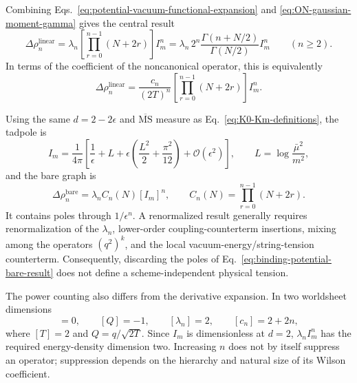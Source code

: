 Combining Eqs.~\eqref{eq:potential-vacuum-functional-expansion} and
\eqref{eq:ON-gaussian-moment-gamma} gives the central result
\begin{equation}
  \boxed{
  \Delta\rho_n^{\mathrm{linear}}
  =\lambda_n\left[\prod_{r=0}^{n-1}(N+2r)\right]I_m^n
  =\lambda_n\,2^n\frac{\Gamma(n+N/2)}{\Gamma(N/2)}I_m^n
  }
  \qquad(n\geq2).
  \label{eq:binding-potential-central-result}
\end{equation}
In terms of the coefficient of the noncanonical operator, this is equivalently
\begin{equation}
  \Delta\rho_n^{\mathrm{linear}}
  =\frac{c_n}{(2T)^n}
   \left[\prod_{r=0}^{n-1}(N+2r)\right]I_m^n.
  \label{eq:binding-potential-noncanonical-result}
\end{equation}

Using the same $d=2-2\epsilon$ and $\overline{\mathrm{MS}}$ measure as
Eq.~\eqref{eq:K0-Km-definitions}, the tadpole is
\begin{equation}
  I_m=\frac{1}{4\pi}
  \left[\frac{1}{\epsilon}+L
  +\epsilon\left(\frac{L^2}{2}+\frac{\pi^2}{12}\right)
  +\mathcal O(\epsilon^2)\right],
  \qquad L=\log\frac{\bar\mu^2}{m^2},
\end{equation}
and the bare graph is
\begin{equation}
  \Delta\rho_n^{\mathrm{bare}}
  =\lambda_n C_n(N)[I_m]^n,
  \qquad C_n(N)=\prod_{r=0}^{n-1}(N+2r).
  \label{eq:binding-potential-bare-result}
\end{equation}
It contains poles through $1/\epsilon^n$.  A renormalized result generally
requires renormalization of the $\lambda_n$, lower-order coupling-counterterm
insertions, mixing among the operators $(q^2)^k$, and the local
vacuum-energy/string-tension counterterm.  Consequently, discarding the poles
of Eq.~\eqref{eq:binding-potential-bare-result} does not define a
scheme-independent physical tension.

The power counting also differs from the derivative expansion.  In two
worldsheet dimensions
\begin{equation}
  [q]=0,
  \qquad [Q]=-1,
  \qquad [\lambda_n]=2,
  \qquad [c_n]=2+2n,
\end{equation}
where $[T]=2$ and $Q=q/\sqrt{2T}$.  Since $I_m$ is dimensionless at $d=2$,
$\lambda_nI_m^n$ has the required energy-density dimension two.  Increasing
$n$ does not by itself suppress an operator; suppression depends on the
hierarchy and natural size of its Wilson coefficient.

